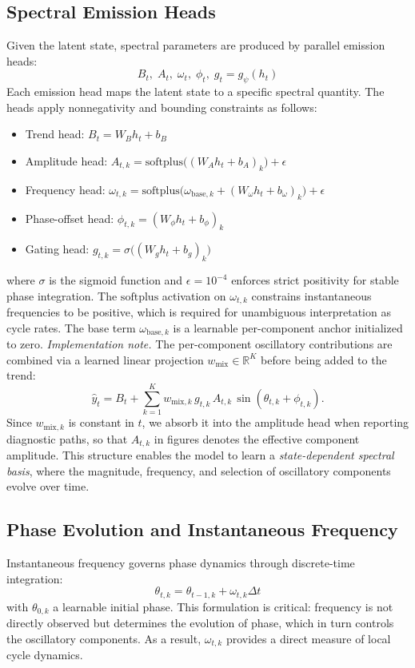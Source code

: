 \subsection{Spectral Emission Heads}
Given the latent state, spectral parameters are produced by parallel emission heads:
\begin{equation}
B_t,\; A_t,\; \omega_t,\; \phi_t,\; g_t = g_{\psi}(h_t)
\end{equation}
Each emission head maps the latent state to a specific spectral quantity. The heads apply nonnegativity and bounding constraints as follows:
\begin{itemize}
\item Trend head: $B_t = W_B h_t + b_B$
\item Amplitude head: $A_{t,k} = \mathrm{softplus}\big((W_A h_t + b_A)_k\big) + \epsilon$
\item Frequency head: $\omega_{t,k} = \mathrm{softplus}\big(\omega_{\mathrm{base},k} + (W_\omega h_t + b_\omega)_k\big) + \epsilon$
\item Phase-offset head: $\phi_{t,k} = (W_\phi h_t + b_\phi)_k$
\item Gating head: $g_{t,k} = \sigma\big((W_g h_t + b_g)_k\big)$
\end{itemize}
where $\sigma$ is the sigmoid function and $\epsilon = 10^{-4}$ enforces strict positivity for stable phase integration. The $\mathrm{softplus}$ activation on $\omega_{t,k}$ constrains instantaneous frequencies to be positive, which is required for unambiguous interpretation as cycle rates. The base term $\omega_{\mathrm{base},k}$ is a learnable per-component anchor initialized to zero.
\textit{Implementation note.} The per-component oscillatory contributions are combined via a learned linear projection $w_{\mathrm{mix}} \in \mathbb{R}^K$ before being added to the trend:
\begin{equation}
\hat y_t = B_t + \sum_{k=1}^{K} w_{\mathrm{mix},k}\, g_{t,k}\, A_{t,k}\, \sin(\theta_{t,k} + \phi_{t,k}).
\end{equation}
Since $w_{\mathrm{mix},k}$ is constant in $t$, we absorb it into the amplitude head when reporting diagnostic paths, so that $A_{t,k}$ in figures denotes the effective component amplitude.
This structure enables the model to learn a \textit{state-dependent spectral basis}, where the magnitude, frequency, and selection of oscillatory components evolve over time.

\subsection{Phase Evolution and Instantaneous Frequency}
Instantaneous frequency governs phase dynamics through discrete-time integration:
\begin{equation}
\theta_{t,k} = \theta_{t-1,k} + \omega_{t,k}\Delta t
\end{equation}
with $\theta_{0,k}$ a learnable initial phase. This formulation is critical: frequency is not directly observed but determines the evolution of phase, which in turn controls the oscillatory components. As a result, $\omega_{t,k}$ provides a direct measure of local cycle dynamics.

